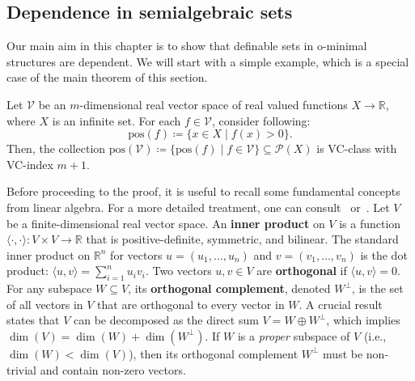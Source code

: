 \subsection{Dependence in semialgebraic sets}

Our main aim in this chapter is to show that definable sets in o-minimal structures are dependent. We will start with a simple example, which is a special case of the main theorem of this section.

\begin{proposition}{\label{prop:vector-space-dependent}}
    Let $\mathcal{V}$ be an $m$-dimensional real vector space of real valued functions $X \to \mathbb{R}$, where $X$ is an infinite set. For each $f \in \mathcal{V}$, consider following:
    \[
        \text{pos}(f) \coloneq \{x \in X \mid f(x) > 0\}.
    \]
    Then, the collection $\text{pos}(\mathcal{V}) \coloneq \{\text{pos}(f) \mid f \in \mathcal{V}\} \subseteq \mathcal{P}(X)$ is VC-class with VC-index $m+1$.
\end{proposition}

Before proceeding to the proof, it is useful to recall some fundamental concepts from linear algebra. For a more detailed treatment, one can consult~\cite{axler1997} or~\cite{strang2016}. Let $V$ be a finite-dimensional real vector space. An \textbf{inner product} on $V$ is a function $\langle \cdot, \cdot \rangle: V \times V \to \mathbb{R}$ that is positive-definite, symmetric, and bilinear. The standard inner product on $\mathbb{R}^n$ for vectors $u=(u_1, \dots, u_n)$ and $v=(v_1, \dots, v_n)$ is the dot product: $\langle u, v \rangle = \sum_{i=1}^n u_i v_i$. Two vectors $u, v \in V$ are \textbf{orthogonal} if $\langle u, v \rangle = 0$. For any subspace $W \subseteq V$, its \textbf{orthogonal complement}, denoted $W^\perp$, is the set of all vectors in $V$ that are orthogonal to every vector in $W$. A crucial result states that $V$ can be decomposed as the direct sum $V = W \oplus W^\perp$, which implies $\dim(V) = \dim(W) + \dim(W^\perp)$. If $W$ is a \emph{proper} subspace of $V$ (i.e., $\dim(W) < \dim(V)$), then its orthogonal complement $W^\perp$ must be non-trivial and contain non-zero vectors.

